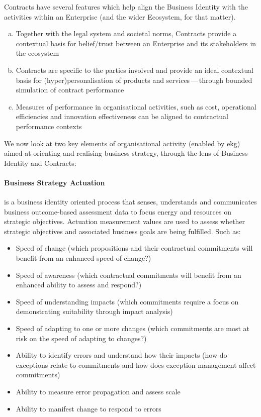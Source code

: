 Contracts have several features which help align the Business Identity with the activities within an Enterprise
(and the wider Ecosystem, for that matter).

\begin{enumerate}[(a)]
    \item Together with the legal system and societal norms, Contracts provide a contextual basis for
          belief/trust between an Enterprise and its stakeholders in the ecosystem
    \item Contracts are specific to the parties involved and provide an ideal contextual basis for
          (hyper)personalisation of products and services\,---\,through bounded simulation of contract performance
    \item Measures of performance in organisational activities, such as cost, operational efficiencies and
          innovation effectiveness can be aligned to contractual performance contexts
\end{enumerate}

We now look at two key elements of organisational activity (enabled by \gls{ekg}) aimed at orienting and
realising business strategy, through the lens of Business Identity and Contracts:

\paragraph*{Business Strategy Actuation} is a business identity oriented process that senses,
understands and communicates business outcome-based assessment data to focus energy and resources on
strategic objectives.
Actuation measurement values are used to assess whether strategic objectives and associated business goals
are being fulfilled.
Such as:

\begin{itemize}
    \item Speed of change
          (which propositions and their contractual commitments will benefit from an enhanced speed of change?)
    \item Speed of awareness
          (which contractual commitments will benefit from an enhanced ability to assess and respond?)
    \item Speed of understanding impacts
          (which commitments require a focus on demonstrating suitability through impact analysis)
    \item Speed of adapting to one or more changes
          (which commitments are most at risk on the speed of adapting to changes?)
    \item Ability to identify errors and understand how their impacts
          (how do exceptions relate to commitments and how does exception management affect commitments)
    \item Ability to measure error propagation and assess scale
    \item Ability to manifest change to respond to errors
\end{itemize}

